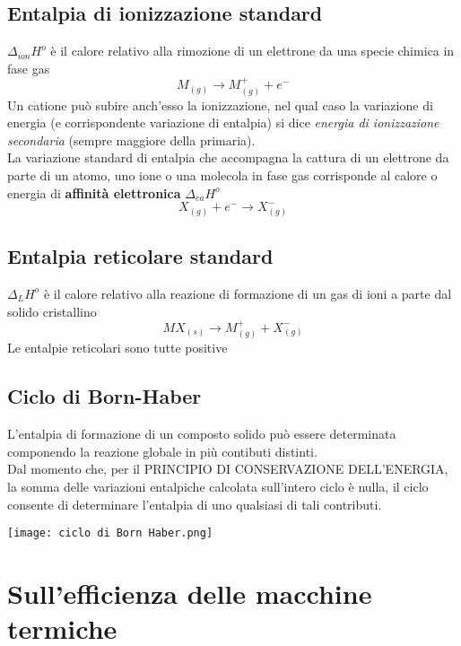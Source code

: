\documentclass{article}
\begin{document}
\subsection{Entalpia di ionizzazione standard}
$\Delta_{ion}H^o$ è il calore relativo alla rimozione di un elettrone da una specie chimica in fase gas
\begin{equation*}
    M_{(g)}\rightarrow M_{(g)}^++e^-
\end{equation*}
Un catione può subire anch'esso la ionizzazione, nel qual caso la variazione di energia (e corrispondente variazione di entalpia) si dice \textit{energia di ionizzazione secondaria} (sempre maggiore della primaria).\\
La variazione standard di entalpia che accompagna la cattura di un elettrone da parte di un atomo, uno ione o una molecola in fase gas corrisponde al calore o energia di \textbf{affinità elettronica} $\Delta_{ea}H^o$
\begin{equation*}
    X_{(g)}+e^-\rightarrow X_{(g)}^-
\end{equation*}

\subsection{Entalpia reticolare standard}
$\Delta_LH^o$ è il calore relativo alla reazione di formazione di un gas di ioni a parte dal solido cristallino
\begin{equation*}
    MX_{(s)}\rightarrow M_{(g)}^++X_{(g)}^-
\end{equation*}
Le entalpie reticolari sono tutte positive

\subsection{Ciclo di Born-Haber}
L'entalpia di formazione di un composto solido può essere determinata componendo la reazione globale in più contibuti distinti.\\
Dal momento che, per il PRINCIPIO DI CONSERVAZIONE DELL'ENERGIA, la somma delle variazioni entalpiche calcolata sull'intero ciclo è nulla, il ciclo consente di determinare l'entalpia di uno qualsiasi di tali contributi.
\begin{center}
    \texttt{[image: ciclo di Born Haber.png]}
\end{center}


\section{Sull'efficienza delle macchine termiche}
\end{document}

